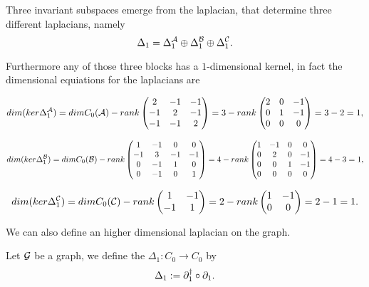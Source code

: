 \documentclass[../2.tex]{subfiles}
\begin{document}
    Three invariant subspaces emerge from the laplacian, that determine three different laplacians, namely
    \[ \Delta_1 = \Delta_1^{\mathcal{A}} \oplus \Delta_1^{\mathcal{B}} \oplus \Delta_1^{\mathcal{C}}. \]

    Furthermore any of those three blocks has a $1$-dimensional kernel, in fact the dimensional equiations for the laplacians are

    \[dim(ker\Delta_1^{\mathcal{A}}) =dimC_0(\mathcal{A}) - rank
    \begin{pmatrix}
        2 & -1 & -1  \\
        -1 & 2 & -1  \\
        -1 & -1 & 2 
    \end{pmatrix} = 3 - rank
    \begin{pmatrix}
        2 & 0 & -1  \\
        0 & 1 & -1  \\
        0 & 0 & 0 
    \end{pmatrix} = 3 - 2 =  1, \]

    \[ dim(ker\Delta_1^{\mathcal{B}}) =dimC_0(\mathcal{B}) - rank
    \begin{pmatrix}
        1 & -1 & 0 & 0  \\
        -1 & 3 & -1 & -1 \\
        0 & -1 & 1 & 0  \\
        0 & -1 & 0 & 1 
    \end{pmatrix} = 4 - rank
    \begin{pmatrix}
        1 & -1 & 0 & 0  \\
        0 & 2 & 0 & -1 \\
        0 & 0 & 1 & -1  \\
        0 & 0 & 0 & 0 
    \end{pmatrix} = 4 - 3 = 1,\]
    
    \[ dim(ker\Delta_1^{\mathcal{C}}) =dimC_0(\mathcal{C}) - rank
    \begin{pmatrix}
        1 & -1 \\
        -1 & 1
    \end{pmatrix} = 2 - rank
    \begin{pmatrix}
        1 & -1 \\
        0 & 0
    \end{pmatrix} = 2-1 = 1.\]

    We can also define an higher dimensional laplacian on the graph.

    \begin{defn}
        Let $\mathcal{G}$ be a graph, we define the  $\Delta_1 : C_0 \to C_0$ by 
        \[ \Delta_1 := \partial_1^\dagger \circ \partial_1.\]
    \end{defn}
\end{document}
